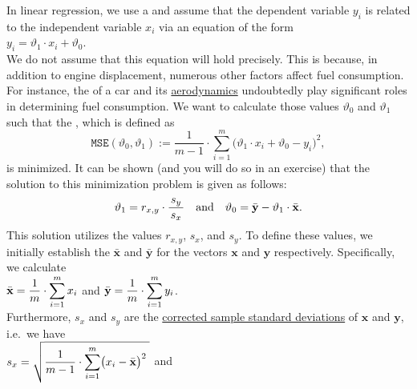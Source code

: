 In linear regression, we use a  
and assume that the dependent variable $y_i$ is related to the independent variable $x_i$ via an
equation of the form
\\[0.2cm]
\hspace*{1.3cm}
$y_i = \vartheta_1 \cdot x_i + \vartheta_0$.
\\[0.2cm]
We do not assume that this equation will hold precisely. This is because, in addition to
engine displacement, numerous other factors affect fuel consumption. For instance, the  of a car and its
\href{https://en.wikipedia.org/wiki/Automotive_aerodynamics}{aerodynamics} undoubtedly play significant roles
in determining fuel consumption. 
We want to calculate those values $\vartheta_0$ and $\vartheta_1$ such that the 
,  which is defined as 
\begin{equation}
  \label{eq:mse}
 \mathtt{MSE}(\vartheta_0, \vartheta_1) := \frac{1}{m-1} \cdot \sum\limits_{i=1}^m \bigl(\vartheta_1 \cdot x_i + \vartheta_0 - y_i\bigr)^2,
\end{equation}
is minimized.  It can be shown (and you will do so in an exercise) that the solution to this minimization
problem is given as follows: 
\begin{equation}
  \label{eq:theta0}
  \displaystyle \vartheta_1 = r_{x,y} \cdot \frac{\,s_y\,}{s_x} \quad \mbox{and} \quad
      \vartheta_0 = \bar{\mathbf{y}} - \vartheta_1 \cdot \bar{\mathbf{x}}.
\end{equation}
This solution utilizes the values $r_{x,y}$, $s_x$, and $s_y$. To define these values, we initially establish
the   $\bar{\mathbf{x}}$ and $\bar{\mathbf{y}}$ for the
vectors $\mathbf{x}$ and $\mathbf{y}$ respectively. Specifically, we calculate 
\\[0.2cm]
\hspace*{1.3cm}
$\displaystyle \bar{\mathbf{x}} = \frac{1}{m} \cdot \sum_{i=1}^m x_i$ \quad and \quad
$\displaystyle \bar{\mathbf{y}} = \frac{1}{m} \cdot \sum_{i=1}^m y_i$.
\\[0.2cm]
Furthermore, $s_x$ and $s_y$ are the \href{https://en.wikipedia.org/wiki/Standard_deviation#Sample_standard_deviation}{corrected sample standard deviations} 
of $\mathbf{x}$ and $\mathbf{y}$, i.e.~we have
\\[0.2cm]
\hspace*{1.3cm}
$\displaystyle s_x = \sqrt{\frac{1}{m-1} \cdot \sum\limits_{i=1}^m \bigl(x_i - \bar{\mathbf{x}}\bigr)^2\;}$ \quad and \quad
